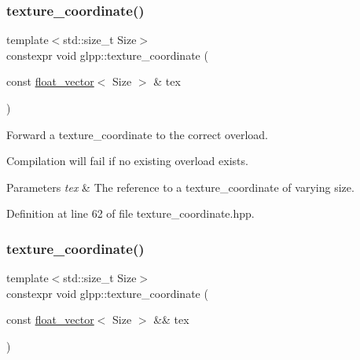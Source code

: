 \subsubsection{\texorpdfstring{texture\+\_\+coordinate()}{texture\_coordinate()}\hspace{0.1cm}{\footnotesize\ttfamily [7/8]}}
{\footnotesize\ttfamily template$<$std\+::size\+\_\+t Size$>$ \\
constexpr void glpp\+::texture\+\_\+coordinate (\begin{DoxyParamCaption}\item[{const \hyperlink{namespaceglpp_a6c618584338a9ebf15759cea2401f0ae}{float\+\_\+vector}$<$ Size $>$ \&}]{tex }\end{DoxyParamCaption})\hspace{0.3cm}{\ttfamily [noexcept]}}



Forward a texture\+\_\+coordinate to the correct overload. 

Compilation will fail if no existing overload exists.


\begin{DoxyParams}{Parameters}
{\em tex} & The reference to a texture\+\_\+coordinate of varying size. \\
\hline
\end{DoxyParams}


Definition at line 62 of file texture\+\_\+coordinate.\+hpp.

\mbox{\label{namespaceglpp_a64fd3eb027251d388a336ef0c31ad5cb}} 
\subsubsection{\texorpdfstring{texture\+\_\+coordinate()}{texture\_coordinate()}\hspace{0.1cm}{\footnotesize\ttfamily [8/8]}}
{\footnotesize\ttfamily template$<$std\+::size\+\_\+t Size$>$ \\
constexpr void glpp\+::texture\+\_\+coordinate (\begin{DoxyParamCaption}\item[{const \hyperlink{namespaceglpp_a6c618584338a9ebf15759cea2401f0ae}{float\+\_\+vector}$<$ Size $>$ \&\&}]{tex }\end{DoxyParamCaption})\hspace{0.3cm}{\ttfamily [noexcept]}}



